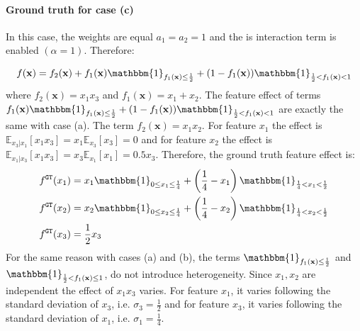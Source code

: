 \documentclass{article} %
\newcommand{\xb}{\mathbf{x}}
\begin{document}
\paragraph{Ground truth for case (c)}

In this case, the weights are equal $a_1 = a_2 = 1$ and the is interaction
term is enabled $(\alpha=1)$.
Therefore:

\begin{equation}
  \label{eq:case-c}
  f(\mathbf{x}) = f_2(\xb) + f_1(\xb) \mathbbm{1}_{f_1(\xb) \leq \frac{1}{2}} + (1 - f_1(\xb)) \mathbbm{1}_{\frac{1}{2} < f_1(\xb) < 1}
\end{equation}
%
where $f_2(\xb) = x_1 x_3$ and $f_1(\xb) = x_1 + x_2$.
The feature effect of terms
$f_1(\xb) \mathbbm{1}_{f_1(\xb) \leq \frac{1}{2}} + (1 - f_1(\xb)) \mathbbm{1}_{\frac{1}{2} < f_1(\xb) < 1}$
are exactly the same with case (a).
The term $f_2(\xb) = x_1 x_2$.
For feature $x_1$ the effect is $\mathbb{E}_{x_3|x_1} [x_1 x_3] = x_1 \mathbb{E}_{x_3} [x_3] = 0$ and
for feature $x_2$ the effect is $\mathbb{E}_{x_1|x_3} [x_1 x_3] = x_3 \mathbb{E}_{x_1} [x_1] = 0.5 x_3$.
Therefore, the ground truth feature effect is:
%
\begin{align}
    \label{eq:case-c-app}
    f^{\mathtt{GT}}(x_1) &= x_1 \mathbbm{1}_{0 \leq x_1 \leq \frac{1}{4}} + \left ( \frac{1}{4} - x_1 \right ) \mathbbm{1}_{\frac{1}{4} < x_1 < \frac{1}{2}} \\
    f^{\mathtt{GT}}(x_2) &= x_2 \mathbbm{1}_{0 \leq x_2 \leq \frac{1}{4}} + \left ( \frac{1}{4} - x_2 \right ) \mathbbm{1}_{\frac{1}{4} < x_2 < \frac{1}{2}} \\
    f^{\mathtt{GT}}(x_3) &= \frac{1}{2} x_3
\end{align}
%
For the same reason with cases (a) and (b), the terms
$\mathbbm{1}_{f_1(\xb) \leq \frac{1}{2}}$ and $\mathbbm{1}_{\frac{1}{2} < f_1(\xb) \leq 1}$,
do not introduce heterogeneity.
Since $x_1, x_2$ are independent the effect of $x_1 x_3$ varies.
For feature $x_1$, it varies following the standard deviation of $x_3$, i.e. $\sigma_3=\frac{1}{2}$ and
for feature $x_3$, it varies following the standard deviation of $x_1$, i.e. $\sigma_1=\frac{1}{4}$.
%
\end{document}
